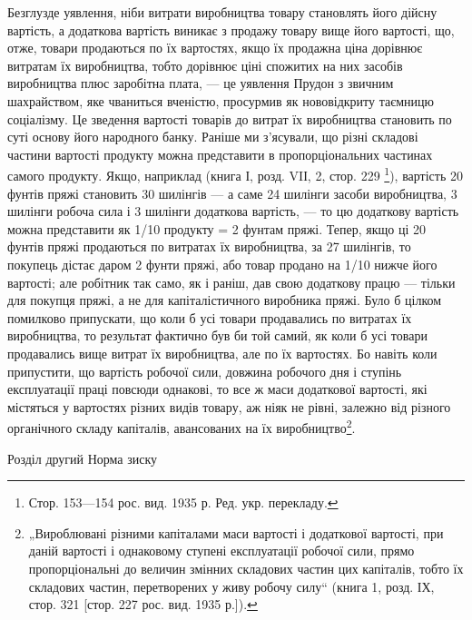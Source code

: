 Безглузде уявлення, ніби витрати виробництва товару становлять
його дійсну вартість, а додаткова вартість виникає
з продажу товару вище його вартості, що, отже, товари продаються
по їх вартостях, якщо їх продажна ціна дорівнює витратам
їх виробництва, тобто дорівнює ціні спожитих на них
засобів виробництва плюс заробітна плата, — це уявлення Прудон
з звичним шахрайством, яке чваниться вченістю, просурмив
як нововідкриту таємницю соціалізму. Це зведення вартості
товарів до витрат їх виробництва становить по суті
основу його народного банку. Раніше ми з’ясували, що різні складові
частини вартості продукту можна представити в пропорціональних
частинах самого продукту. Якщо, наприклад (книга І,
розд. VIІ, 2, стор. 229 \footnote*{
Стор. 153—154 рос. вид. 1935 р. Ред. укр. перекладу.
}), вартість 20 фунтів пряжі становить
30 шилінгів — а саме 24 шилінги засоби виробництва, 3 шилінги
робоча сила і 3 шилінги додаткова вартість, — то цю додаткову
вартість можна представити як 1/10 продукту = 2 фунтам пряжі.
Тепер, якщо ці 20 фунтів пряжі продаються по витратах їх
виробництва, за 27 шилінгів, то покупець дістає даром 2 фунти
пряжі, або товар продано на 1/10 нижче його вартості; але робітник
так само, як і раніш, дав свою додаткову працю — тільки
для покупця пряжі, а не для капіталістичного виробника пряжі.
Було б цілком помилково припускати, що коли б усі товари
продавались по витратах їх виробництва, то результат фактично
був би той самий, як коли б усі товари продавались вище витрат
їх виробництва, але по їх вартостях. Бо навіть коли припустити,
що вартість робочої сили, довжина робочого дня
і ступінь експлуатації праці повсюди однакові, то все ж маси
додаткової вартості, які містяться у вартостях різних видів
товару, аж ніяк не рівні, залежно від різного органічного складу
капіталів, авансованих на їх виробництво\footnote{
„Вироблювані різними капіталами маси вартості і додаткової вартості, при
даній вартості і однаковому ступені експлуатації робочої сили, прямо пропорціональні
до величин змінних складових частин цих капіталів, тобто їх складових
частин, перетворених у живу робочу силу“ (книга 1, розд. ІХ, стор. 321
[стор. 227 рос. вид. 1935 р.]).
}.

Розділ другий
Норма зиску

